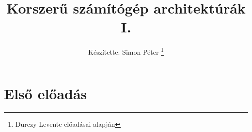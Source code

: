 \documentclass{report}
\title{Korszerű számítógép architektúrák I.}
\author{Készítette: Simon Péter \thanks{Durczy Levente előadásai alapján}}
\begin{document}
\maketitle
\tableofcontents

\chapter{Első előadás}






\end{document}
